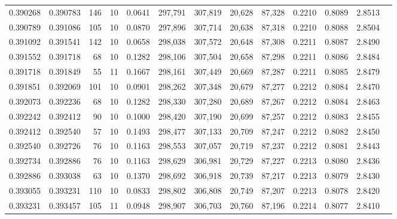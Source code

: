 \begin{tabular}{rrrrrrrrrrrrr}
0.390268 & 0.390783 &   146 &  10 &                                     0.0641 & 297,791 & 307,819 &  20,628 &  87,328 & 0.2210 & 0.8089 & 2.8513 \\
0.390789 & 0.391086 &   105 &  10 &                                     0.0870 & 297,896 & 307,714 &  20,638 &  87,318 & 0.2210 & 0.8088 & 2.8504 \\
0.391092 & 0.391541 &   142 &  10 &                                     0.0658 & 298,038 & 307,572 &  20,648 &  87,308 & 0.2211 & 0.8087 & 2.8490 \\
0.391552 & 0.391718 &    68 &  10 &                                     0.1282 & 298,106 & 307,504 &  20,658 &  87,298 & 0.2211 & 0.8086 & 2.8484 \\
0.391718 & 0.391849 &    55 &  11 &                                     0.1667 & 298,161 & 307,449 &  20,669 &  87,287 & 0.2211 & 0.8085 & 2.8479 \\
0.391851 & 0.392069 &   101 &  10 &                                     0.0901 & 298,262 & 307,348 &  20,679 &  87,277 & 0.2212 & 0.8084 & 2.8470 \\
0.392073 & 0.392236 &    68 &  10 &                                     0.1282 & 298,330 & 307,280 &  20,689 &  87,267 & 0.2212 & 0.8084 & 2.8463 \\
0.392242 & 0.392412 &    90 &  10 &                                     0.1000 & 298,420 & 307,190 &  20,699 &  87,257 & 0.2212 & 0.8083 & 2.8455 \\
0.392412 & 0.392540 &    57 &  10 &                                     0.1493 & 298,477 & 307,133 &  20,709 &  87,247 & 0.2212 & 0.8082 & 2.8450 \\
0.392540 & 0.392726 &    76 &  10 &                                     0.1163 & 298,553 & 307,057 &  20,719 &  87,237 & 0.2212 & 0.8081 & 2.8443 \\
0.392734 & 0.392886 &    76 &  10 &                                     0.1163 & 298,629 & 306,981 &  20,729 &  87,227 & 0.2213 & 0.8080 & 2.8436 \\
0.392886 & 0.393038 &    63 &  10 &                                     0.1370 & 298,692 & 306,918 &  20,739 &  87,217 & 0.2213 & 0.8079 & 2.8430 \\
0.393055 & 0.393231 &   110 &  10 &                                     0.0833 & 298,802 & 306,808 &  20,749 &  87,207 & 0.2213 & 0.8078 & 2.8420 \\
0.393231 & 0.393457 &   105 &  11 &                                     0.0948 & 298,907 & 306,703 &  20,760 &  87,196 & 0.2214 & 0.8077 & 2.8410 \\

\end{tabular}
